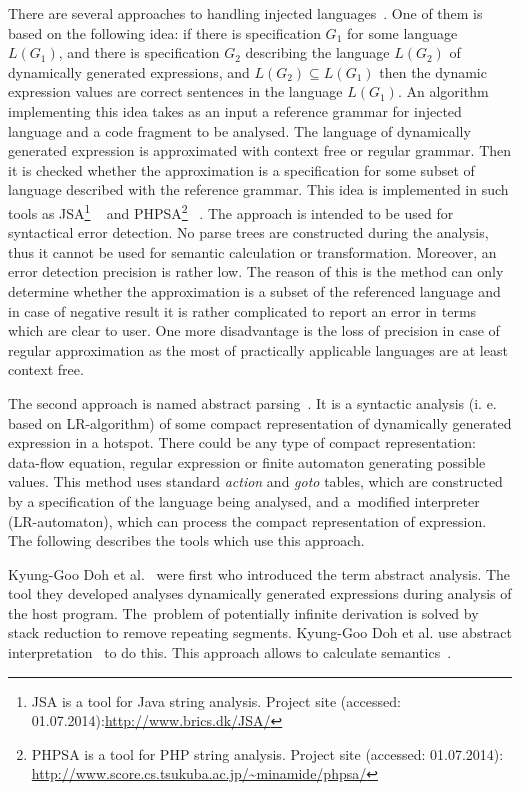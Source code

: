 \documentclass{sigplanconf}
\begin{document}
There are several approaches to handling injected languages~\cite{ALVOR1, LRAbstrParsing, Minamide, StringExpr, SAofStrVal, SAForInject, Dasgupta}. One of them is based on the following idea: if there is specification $G_1$ for some language $L(G_1)$, and there is specification $G_2$ describing the language $L(G_2)$ of dynamically generated expressions, and $L(G_2) \subseteq L(G_1)$ then the dynamic expression values are correct sentences in the language $L(G_1)$. An algorithm implementing this idea takes as an input a reference grammar for injected language and a code fragment to be analysed. The language of dynamically generated expression is approximated with context free or regular grammar. Then it is checked whether the approximation is a specification for some subset of language described with the reference grammar. This idea is implemented in such tools as JSA\footnote{JSA is a tool for Java string analysis. Project site (accessed: 01.07.2014):\url{http://www.brics.dk/JSA/}} ~\cite{StringExpr} and PHPSA\footnote{PHPSA is a tool for PHP string analysis. Project site (accessed: 01.07.2014): \url{http://www.score.cs.tsukuba.ac.jp/~minamide/phpsa/} } ~\cite{Minamide}. The approach is intended to be used for syntactical error detection. No parse trees are constructed during the analysis, thus it cannot be used for semantic calculation or transformation. Moreover, an error detection precision is rather low. The reason of this is the method can only determine whether the approximation is a subset of the referenced language and in case of negative result it is rather complicated to report an error in terms which are clear to user. One more disadvantage is the loss of precision in case of regular approximation as the most of practically applicable languages are at least context free. 

The second approach is named abstract parsing~\cite{LRAbstrParsing}. It is a syntactic analysis (i. e. based on LR-algorithm) of some compact representation of dynamically generated expression in a hotspot. There could be any type of compact representation: data-flow equation, regular expression or finite automaton generating possible values. This method uses standard {\it action} and {\it goto} tables, which are constructed by a specification of the language being analysed, and a~modified interpreter (LR-automaton), which can process the compact representation of expression. The following describes the tools which use this approach. 

Kyung-Goo Doh et al.~\cite{AbstrParsing, LRAbstrParsing, LRAbstrParsingSema} were first who introduced the term abstract analysis. The tool they developed analyses dynamically generated expressions during analysis of the host program. The~problem of potentially infinite derivation is solved by stack reduction to remove repeating segments. Kyung-Goo Doh et al. use abstract interpretation~\cite{AbstractInterpretation} to do this. This approach allows to calculate semantics~\cite{LRAbstrParsingSema}.
\end{document}
